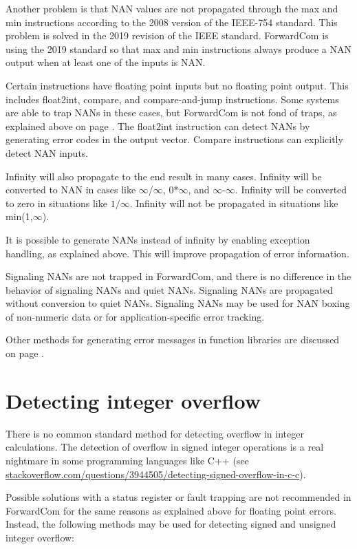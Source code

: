 \documentclass[forwardcom.tex]{subfiles}
\begin{document}
Another problem is that NAN values are not propagated through the max and min instructions according to the 2008 version of the IEEE-754 standard. 
This problem is solved in the 2019 revision of the IEEE standard. ForwardCom is using the 2019 standard so that max and min instructions always produce a NAN output when at least one of the inputs is NAN.
\vv

Certain instructions have floating point inputs but no floating point output. 
This includes float2int, compare, and compare-and-jump instructions. 
Some systems are able to trap NANs in these cases, but ForwardCom is not fond of traps, as explained above on page \pageref{FloatingPointErrors}. The float2int instruction can detect NANs by generating error codes in the output vector. Compare instructions can explicitly detect NAN inputs.
\vv

Infinity will also propagate to the end result in many cases. 
Infinity will be converted to NAN in cases like $\infty$/$\infty$, 0*$\infty$, and $\infty$-$\infty$.
Infinity will be converted to zero in situations like $1/\infty$. Infinity will not be propagated in situations like min(1,$\infty$).
\vv

It is possible to generate NANs instead of infinity by enabling exception handling, as explained above. This will improve propagation of error information. 
\vv

Signaling NANs are not trapped in ForwardCom, and there is no difference in the behavior of signaling NANs and quiet NANs. Signaling NANs are propagated without conversion to quiet NANs. Signaling NANs may be used for NAN boxing of non-numeric data or for application-specific error tracking.
\vv

Other methods for generating error messages in function libraries are discussed on page \pageref{errorMessageHandling}.
\vv


\section{Detecting integer overflow} 
\label{integerOverflowDetection}
There is no common standard method for detecting overflow in integer calculations. The detection of overflow in signed integer operations is a real nightmare in some programming languages like C++ (see 
\href{https://stackoverflow.com/questions/3944505/detecting-signed-overflow-in-c-c}{stackoverflow.com/questions/3944505/detecting-signed-overflow-in-c-c}).
\vv

Possible solutions with a status register or fault trapping are not recommended in ForwardCom for the same reasons as explained above for floating point errors. 
Instead, the following methods may be used for detecting signed and unsigned integer overflow: 
\end{document}
